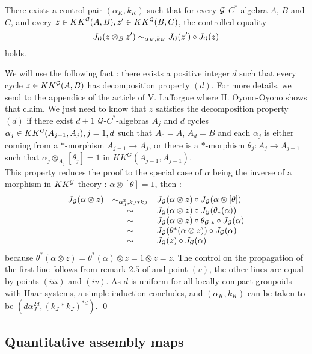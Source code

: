 \begin{prop} There exists a control pair $(\alpha_K,k_K)$ such that for every $\mathcal G$-$C^*$-algebra $A$, $B$ and $C$, and every $z\in KK^\mathcal G(A,B),z'\in KK^\mathcal G(B,C)$, the controlled equality
\[J_\mathcal G(z\otimes_B z') \sim_{\alpha_K,k_K} J_\mathcal G(z')\circ J_\mathcal G(z)\]
holds.
\end{prop}
\begin{dem}
We will use the following fact : there exists a positive integer $d$ such that every cycle $z\in KK^\mathcal G(A,B)$ has decomposition property $(d)$. For more details, we send to the appendice of the article of V. Lafforgue \cite{LaffOY} where H. Oyono-Oyono shows that claim. We just need to know that $z$ satisfies the decomposition property $(d)$ if there exist $d+1$ $\mathcal G$-$C^*$-algebras $A_j$  and $d$ cycles $\alpha_j\in KK^\mathcal G(A_{j-1},A_j), j=1,d$ such that $A_0=A$, $A_d=B$ and each $\alpha_j$ is either coming from a $*$-morphism $A_{j-1}\rightarrow A_j$, or there is a $*$-morphism $\theta_j: A_j\rightarrow A_{j-1}$ such that $\alpha_j \otimes_{A_j} [\theta_j]=1$ in $KK^G(A_{j-1},A_{j-1})$.\\

This property reduces the proof to the special case of $\alpha$ being the inverse of a morphism in $KK^\mathcal G$-theory : $\alpha\otimes[\theta]=1$, then :
\[\begin{array}{rcl}
J_\mathcal G (\alpha\otimes z) & \sim_{\alpha_J^2,k_J*k_J} &  J_\mathcal G(\alpha\otimes z)\circ J_\mathcal G(\alpha\otimes [\theta]) \\
			& \sim & J_\mathcal G(\alpha\otimes z)\circ J_\mathcal G(\theta_*(\alpha))\\
			& \sim & J_\mathcal G(\alpha\otimes z)\circ \theta_{\mathcal G,*}\circ J_\mathcal G(\alpha)\\
			& \sim & J_\mathcal G(\theta^*(\alpha\otimes z))\circ J_\mathcal G(\alpha)\\
			& \sim & J_\mathcal G(z)\circ J_\mathcal G(\alpha) \\
\end{array}\] 
because $\theta^*(\alpha\otimes z)=\theta^*(\alpha)\otimes z=1\otimes z =z$. The control on the propagation of the first line follows from remark $2.5$ of \cite{OY2} and point $(v)$, the other lines are equal by points $(iii)$ and $(iv)$. As $d$ is uniform for all locally compact groupoids with Haar systems, a simple induction concludes, and $(\alpha_K,k_K)$ can be taken to be $(d \alpha_J^{2d},( k_J*k_J)^{*d})$.
\qed
\end{dem}
\subsection{Quantitative assembly maps}

